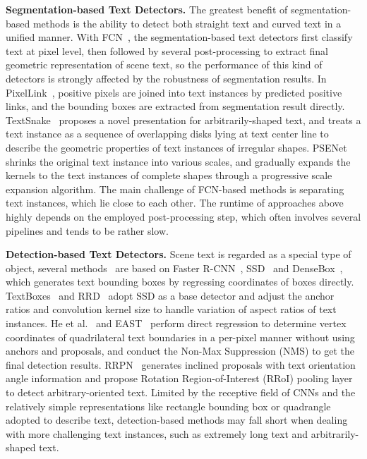\documentclass[sigconf]{acmart}
\begin{document}
\textbf{Segmentation-based Text Detectors.}
The greatest benefit of segmentation-based methods is the ability to detect both straight text and curved text in a unified manner. With FCN~\cite{milletari2016v}, the segmentation-based text detectors first classify text at pixel level, then followed by several post-processing to extract final geometric representation of scene text, so the performance of this kind of detectors is strongly affected by the robustness of segmentation results. In PixelLink~\cite{deng2018pixellink}, positive pixels are joined into text instances by predicted positive links, and the bounding boxes are extracted from segmentation result directly. TextSnake~\cite{long2018textsnake} proposes a novel presentation for arbitrarily-shaped text, and treats a text instance as a sequence of overlapping disks lying at text center line to describe the geometric properties of text instances of irregular shapes. PSENet~\cite{wang2019shape} shrinks the original text instance into various scales, and gradually expands the kernels to the text instances of complete shapes through a progressive scale expansion algorithm. The main challenge of FCN-based methods is separating text instances, which lie close to each other. The runtime of approaches above highly depends on the employed post-processing step, which often involves several pipelines and tends to be rather slow. 

\textbf{Detection-based Text Detectors.}
 Scene text is regarded as a special type of object, several methods~\cite{he2017deep,liao2017textboxes, liao2018rotation, ma2018arbitrary, zhou2017east, Zhang2019CVPR} are based on Faster R-CNN~\cite{ren2015faster}, SSD~\cite{Liu2016SSDSS} and DenseBox~\cite{huang2015densebox}, which generates text bounding boxes by regressing coordinates of boxes directly. TextBoxes~\cite{liao2017textboxes} and RRD~\cite{liao2018rotation} adopt SSD as a base detector and adjust the anchor ratios and convolution kernel size to handle variation of aspect ratios of text instances. He et al.~\cite{he2017deep} and EAST~\cite{zhou2017east} perform direct regression to determine vertex coordinates of quadrilateral text boundaries in a per-pixel manner without using anchors and proposals, and conduct the Non-Max Suppression (NMS) to get the final detection results. RRPN~\cite{ma2018arbitrary} generates inclined proposals with text orientation angle information and propose Rotation Region-of-Interest (RRoI) pooling layer to detect arbitrary-oriented text. Limited by the receptive field of CNNs and the relatively simple representations like rectangle bounding box or quadrangle adopted to describe text, detection-based methods may fall short when dealing with more challenging text instances, such as extremely long text and arbitrarily-shaped text. 
\end{document}
